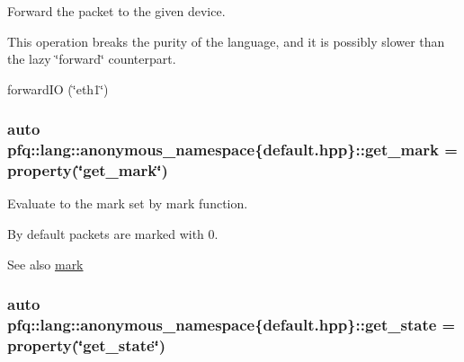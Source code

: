 Forward the packet to the given device. 

This operation breaks the purity of the language, and it is possibly slower than the lazy \char`\"{}forward\char`\"{} counterpart.

forward\+IO (\char`\"{}eth1\char`\"{}) 
\subsubsection[{\texorpdfstring{get\+\_\+mark}{get_mark}}]{\setlength{\rightskip}{0pt plus 5cm}auto pfq\+::lang\+::anonymous\+\_\+namespace\{default.\+hpp\}\+::get\+\_\+mark = {\bf property}(\char`\"{}get\+\_\+mark\char`\"{})}\hypertarget{namespacepfq_1_1lang_1_1anonymous__namespace_02default_8hpp_03_ab733e24b3ca86450bea0b0888a6327d2}{}\label{namespacepfq_1_1lang_1_1anonymous__namespace_02default_8hpp_03_ab733e24b3ca86450bea0b0888a6327d2}


Evaluate to the mark set by {\ttfamily mark} function. 

By default packets are marked with 0.

\begin{DoxySeeAlso}{See also}
\hyperlink{namespacepfq_1_1lang_1_1anonymous__namespace_02default_8hpp_03_a7b831baeabda070b89ca862a9445a4a8}{mark} 
\end{DoxySeeAlso}
\subsubsection[{\texorpdfstring{get\+\_\+state}{get_state}}]{\setlength{\rightskip}{0pt plus 5cm}auto pfq\+::lang\+::anonymous\+\_\+namespace\{default.\+hpp\}\+::get\+\_\+state = {\bf property}(\char`\"{}get\+\_\+state\char`\"{})}\hypertarget{namespacepfq_1_1lang_1_1anonymous__namespace_02default_8hpp_03_acd2598e95a0ebc3c21e84f9c861d0d98}{}\label{namespacepfq_1_1lang_1_1anonymous__namespace_02default_8hpp_03_acd2598e95a0ebc3c21e84f9c861d0d98}


